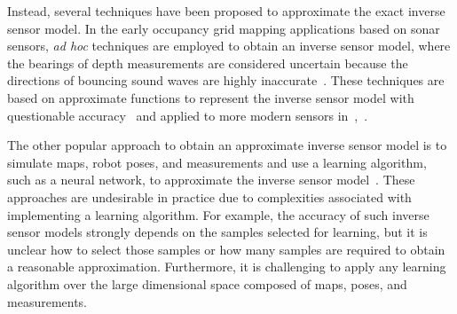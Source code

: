 \documentclass[letterpaper, 10pt, conference]{ieeeconf}
\newcommand{\EditTL}[1]{{\color{red}\protect #1}}
\begin{document}
Instead, several techniques have been proposed to approximate the exact inverse sensor model. %
In the early occupancy grid mapping applications based on sonar sensors, \emph{ad hoc} techniques are employed to obtain an inverse sensor model, where the bearings of depth measurements are considered uncertain because the directions of bouncing sound waves are highly inaccurate~\cite{MorElf85,Elf89}.
These techniques are based on approximate functions to represent the inverse sensor model with questionable accuracy~\cite{ChoLynHutKanBurKavThr05} and applied to more modern sensors in~\cite{And09},~\cite{PirRutBisSch11}.

The other popular approach to obtain an approximate inverse sensor model is to simulate maps, robot poses, and measurements and use a learning algorithm, such as a neural network, to approximate the inverse sensor model~\cite{Thr01,ThrBurFox05}. These approaches are undesirable in practice due to complexities associated with implementing a learning algorithm. For example, the accuracy of such inverse sensor models strongly depends on the samples selected for learning, but it is unclear how to select those samples or how many samples are required to obtain a reasonable approximation. Furthermore, it is challenging to apply any learning algorithm over the large dimensional space composed of maps, poses, and measurements. 




\end{document}
